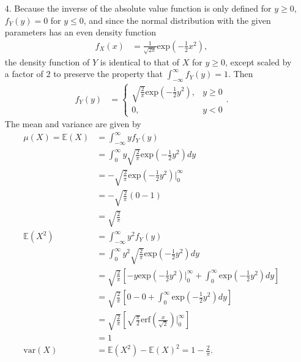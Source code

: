 \documentclass[a4paper,12pt]{article}
\begin{document}
\begin{enumerate}
    \item[4.] 
        Because the inverse of the absolute value function is only defined for $y \geq 0$, $f_Y(y) = 0$ for $y \leq 0$, and since the normal distribution with the given parameters has an even density function
        \begin{align*}
            f_X(x) &= \frac{1}{\sqrt{2\pi}} \text{exp} \left( -\frac{1}{2} x^2 \right),
        \end{align*}
        the density function of $Y$ is identical to that of $X$ for $y \geq 0$, except scaled by a factor of $2$ to preserve the property that $\int_{-\infty}^\infty f_Y(y) = 1$. Then
        \begin{align*}
            f_Y(y) &=
            \begin{cases}
                \sqrt{\frac{2}{\pi}} \text{exp} \left( -\frac{1}{2} y^2 \right), & y \geq 0 \\
                0, & y < 0
            \end{cases}.
        \end{align*}
        The mean and variance are given by
        \begin{align*}
            \mu(X) = \mathbb{E}(X) &= \int_{-\infty}^\infty y f_Y(y) \\
            &= \int_0^\infty y \sqrt{\frac{2}{\pi}} \text{exp} \left( -\frac{1}{2} y^2 \right) dy \\
            &= -\sqrt{\frac{2}{\pi}} \text{exp} \left( -\frac{1}{2} y^2 \right) \biggr\rvert_{0}^\infty \\
            &= -\sqrt{\frac{2}{\pi}} (0 - 1) \\
            &= \sqrt{\frac{2}{\pi}} \\
            \mathbb{E}(X^2) &= \int_{-\infty}^\infty y^2 f_Y(y) \\
            &= \int_0^\infty y^2 \sqrt{\frac{2}{\pi}} \text{exp} \left( -\frac{1}{2} y^2 \right) dy \\
            &= \sqrt{\frac{2}{\pi}} \left[ -y \text{exp} \left( -\frac{1}{2}y^2 \right) \biggr\rvert_{0}^\infty + \int_0^\infty \text{exp} \left( -\frac{1}{2} y^2 \right) dy \right] \\
            &= \sqrt{\frac{2}{\pi}} \left[ 0 - 0 + \int_0^\infty \text{exp} \left( -\frac{1}{2} y^2 \right) dy \right] \\
            &= \sqrt{\frac{2}{\pi}} \left[ \sqrt{\frac{\pi}{2}} \text{erf} \left( \frac{x}{\sqrt{2}} \right) \biggr\rvert_{0}^\infty \right] \\
            &= 1 \\
            \text{var}(X) &= \mathbb{E}(X^2) - \mathbb{E}(X)^2 = 1 - \frac{2}{\pi}.
        \end{align*}


\end{enumerate}
\end{document}
